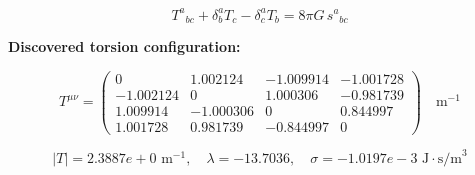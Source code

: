 
\begin{equation}
  T^a{}_{bc} + \delta^a_b T_c - \delta^a_c T_b = 8\pi G \, s^a{}_{bc}
\end{equation}

\textbf{Discovered torsion configuration:}

\begin{equation}
  T^{\mu\nu} = \begin{pmatrix}
    0 & 1.002124 & -1.009914 & -1.001728 \\
    -1.002124 & 0 & 1.000306 & -0.981739 \\
    1.009914 & -1.000306 & 0 & 0.844997 \\
    1.001728 & 0.981739 & -0.844997 & 0
  \end{pmatrix} \quad \text{m}^{-1}
\end{equation}

\begin{equation}
  |T| = 2.3887e+0 \text{ m}^{-1}, \quad
  \lambda = -13.7036, \quad
  \sigma = -1.0197e-3 \text{ J}\cdot\text{s/m}^3
\end{equation}